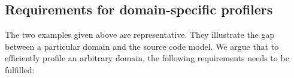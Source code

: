 \documentclass[runningheads]{llncs}
\newcommand{\ct}{\lstinline[backgroundcolor=\color{white},basicstyle=\footnotesize\ttfamily]}
\newcommand{\ugh}[1]{\textcolor{red}{\uwave{#1}}} %
\newcommand{\lr}[1]{\nb{Lukas}{orange}{#1}}
\newcommand{\on}[1]{\nb{Oscar}{olive}{#1}}
\begin{document}


% 
% 
% 
% 

\subsection{Requirements for domain-specific profilers}

The two examples given above are representative. They illustrate the gap between a particular domain and the source code model. We argue that to efficiently profile an arbitrary domain, the following requirements needs to be fulfilled:
\end{document}
